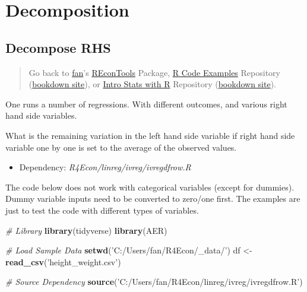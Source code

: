 \documentclass[
]{book}
\newenvironment{Shaded}{\begin{snugshade}}{\end{snugshade}}
\newcommand{\CommentTok}[1]{\textcolor[rgb]{0.56,0.35,0.01}{\textit{#1}}}
\newcommand{\KeywordTok}[1]{\textcolor[rgb]{0.13,0.29,0.53}{\textbf{#1}}}
\newcommand{\NormalTok}[1]{#1}
\newcommand{\StringTok}[1]{\textcolor[rgb]{0.31,0.60,0.02}{#1}}
\providecommand{\tightlist}{%
  \setlength{\itemsep}{0pt}\setlength{\parskip}{0pt}}
\begin{document}
\hypertarget{decomposition}{%
\section{Decomposition}\label{decomposition}}

\hypertarget{decompose-rhs}{%
\subsection{Decompose RHS}\label{decompose-rhs}}

\begin{quote}
Go back to \href{http://fanwangecon.github.io/}{fan}'s \href{https://fanwangecon.github.io/REconTools/}{REconTools} Package, \href{https://fanwangecon.github.io/R4Econ/}{R Code Examples} Repository (\href{https://fanwangecon.github.io/R4Econ/bookdown}{bookdown site}), or \href{https://fanwangecon.github.io/Stat4Econ/}{Intro Stats with R} Repository (\href{https://fanwangecon.github.io/Stat4Econ/bookdown}{bookdown site}).
\end{quote}

One runs a number of regressions. With different outcomes, and various right hand side variables.

What is the remaining variation in the left hand side variable if right hand side variable one by one is set to the average of the observed values.

\begin{itemize}
\tightlist
\item
  Dependency: \emph{R4Econ/linreg/ivreg/ivregdfrow.R}
\end{itemize}

The code below does not work with categorical variables (except for dummies). Dummy variable inputs need to be converted to zero/one first. The examples are just to test the code with different types of variables.

\begin{Shaded}
\begin{Highlighting}[]
\CommentTok{# Library}
\KeywordTok{library}\NormalTok{(tidyverse)}
\KeywordTok{library}\NormalTok{(AER)}

\CommentTok{# Load Sample Data}
\KeywordTok{setwd}\NormalTok{(}\StringTok{'C:/Users/fan/R4Econ/_data/'}\NormalTok{)}
\NormalTok{df <-}\StringTok{ }\KeywordTok{read_csv}\NormalTok{(}\StringTok{'height_weight.csv'}\NormalTok{)}

\CommentTok{# Source Dependency}
\KeywordTok{source}\NormalTok{(}\StringTok{'C:/Users/fan/R4Econ/linreg/ivreg/ivregdfrow.R'}\NormalTok{)}
\end{Highlighting}
\end{Shaded}
\end{document}
